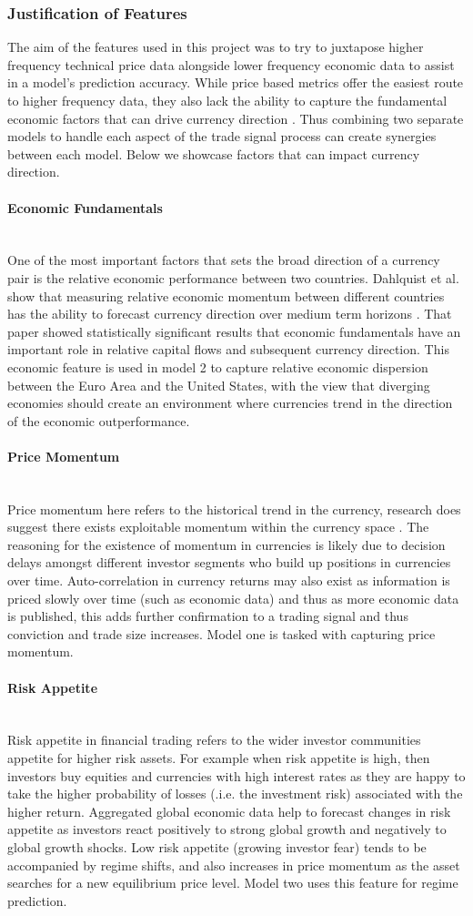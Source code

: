 \documentclass[11pt]{article}
\newcommand{\myparagraph}[1]{\paragraph{#1}\mbox{}\\}
\begin{document}
\subsubsection{Justification of Features} \label{justify}
The aim of the features used in this project was to try to juxtapose higher frequency technical price data alongside lower frequency economic data to assist in a model's prediction accuracy. While price based metrics offer the easiest route to higher frequency data, they also lack the ability to capture the fundamental economic factors that can drive currency direction \cite{medium}. Thus combining two separate models to handle each aspect of the trade signal process can create synergies between each model. 
Below we showcase factors that can impact currency direction.
\myparagraph{Economic Fundamentals} 
One of the most important factors that sets the broad direction of a currency pair is the relative economic performance between two countries.
Dahlquist et al. show that measuring relative economic momentum between different countries has the ability to forecast currency direction over medium term horizons \cite{Dahlquist2015}. That paper showed statistically significant results that economic fundamentals have an important role in relative capital flows and subsequent currency direction. This economic feature is used in model 2 to capture relative economic dispersion between the Euro Area and the United States, with the view that diverging economies should create an environment where currencies trend in the direction of the economic outperformance. 
\myparagraph{Price Momentum}
Price momentum here refers to the historical trend in the currency,  research does suggest there exists  exploitable momentum within the currency space \cite{Moskowitz2012}. The reasoning for the existence of momentum in currencies is likely due to decision delays amongst different investor segments who build up positions in currencies over time. Auto-correlation in currency returns may also exist as information is priced slowly over time (such as economic data) and thus as more economic data is published, this adds further confirmation to a trading signal and thus conviction and trade size increases. Model one is tasked with capturing price momentum.
\myparagraph{Risk Appetite}
Risk appetite in financial trading refers to the wider investor communities appetite for higher risk assets. For example when risk appetite is high, then investors buy equities and currencies with high interest rates as they are happy to take the higher probability of losses (.i.e. the investment risk) associated with the higher return. Aggregated global economic data help to forecast changes in risk appetite as investors react positively to strong global growth and negatively to global growth shocks. Low risk appetite (growing investor fear) tends to be accompanied by regime shifts, and also increases in price momentum as the asset searches for a new equilibrium price level. Model two uses this feature for regime prediction.
\end{document}
